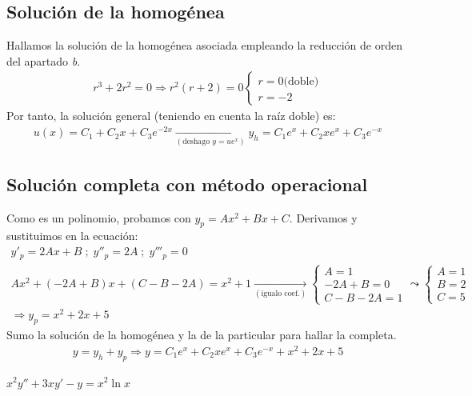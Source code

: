 \documentclass[]{scrartcl}
\begin{document}
\subsection{Solución de la homogénea}

Hallamos la solución de la homogénea asociada empleando la reducción de orden del apartado \textit{b}.
\begin{gather*}
	r^3+2r^2=0 \Rightarrow r^2(r+2)=0
	\left\{
	\begin{array}{l}
		r=0 \text{(doble)}\\
		r=-2
	\end{array}
	\right.
\end{gather*}
Por tanto, la solución general (teniendo en cuenta la raíz doble) es:
\begin{gather*}
	u(x)=C_1+C_2x+C_3e^{-2x} \xrightarrow[(\text{deshago } y=ue^x)]{} \boxed{y_h=C_1e^x+C_2xe^x+C_3e^{-x}}
\end{gather*}

\subsection{Solución completa con método operacional}

Como es un polinomio, probamos con $y_p=Ax^2+Bx+C$. Derivamos y sustituimos en la ecuación:
\begin{gather*}
	y'_p=2Ax+B\; ; \; y''_p=2A\; ; \; y'''_p=0\\
	Ax^2+(-2A+B)x+(C-B-2A)=x^2+1 \xrightarrow[(\text{igualo coef.})]{} 
	\left\{
	\begin{array}{l}
		A=1\\
		-2A+B=0\\
		C-B-2A=1
	\end{array}
	\right. \leadsto \left\{
	\begin{array}{l}
		A=1\\
		B=2\\
		C=5
	\end{array}
	\right. \\
	\Rightarrow y_p=x^2+2x+5
\end{gather*}
Sumo la solución de la homogénea y la de la particular para hallar la completa.
\begin{gather*}
	y=y_h+y_p \Rightarrow \boxed{y=C_1e^x+C_2xe^x+C_3e^{-x}+x^2+2x+5}
\end{gather*}

\begin{center}
	$x^2y''+3xy'-y=x^2\ln x$
\end{center}
\end{document}
